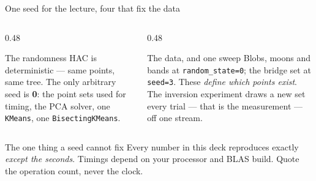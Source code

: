 \documentclass[aspectratio=169]{beamer}
\begin{document}
\begin{frame}{One seed for the lecture, four that fix the data}
  \begin{columns}[T]
    \begin{column}{0.48\textwidth}
      \begin{block}{The randomness}
        \small HAC is deterministic --- same points, same tree. The only
        arbitrary seed is \textbf{0}: the point sets used for timing, the
        PCA solver, one \texttt{KMeans}, one \texttt{BisectingKMeans}.
      \end{block}
    \end{column}
    \begin{column}{0.48\textwidth}
      \begin{block}{The data, and one sweep}
        \small Blobs, moons and bands at \texttt{random\_state=0}; the
        bridge set at \texttt{seed=3}. These \emph{define which points
        exist}. The inversion experiment draws a new set every trial ---
        that is the measurement --- off one stream.
      \end{block}
    \end{column}
  \end{columns}
  \vspace{0.5em}
  \begin{alertblock}{The one thing a seed cannot fix}
    \centering\small
    Every number in this deck reproduces exactly \emph{except the seconds}.
    Timings depend on your processor and BLAS build. Quote the operation
    count, never the clock.
  \end{alertblock}
\end{frame}
\end{document}
